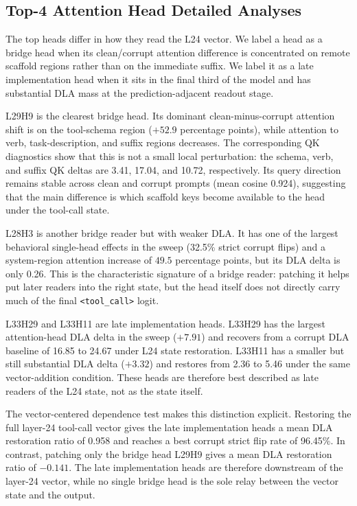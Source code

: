 \subsection{Top-4 Attention Head Detailed Analyses}
The top heads differ in how they read the L24 vector.  We label a head as a
bridge head when its clean/corrupt attention difference is concentrated on
remote scaffold regions rather than on the immediate suffix.  We label it as a
late implementation head when it sits in the final third of the model and has
substantial DLA mass at the prediction-adjacent readout stage.

L29H9 is the clearest bridge head.  Its dominant clean-minus-corrupt attention
shift is on the tool-schema region ($+52.9$ percentage points),
while attention to verb, task-description, and suffix regions decreases.  The corresponding
QK diagnostics show that this is not a small local perturbation: the schema,
verb, and suffix QK deltas are 3.41, 17.04, and 10.72, respectively.  Its
query direction remains stable across clean and corrupt prompts
(mean cosine 0.924), suggesting that the main difference is which scaffold
keys become available to the head under the tool-call state.

L28H3 is another bridge reader but with weaker DLA.  It has one of the largest
behavioral single-head effects in the sweep (32.5\% strict corrupt flips) and
a system-region attention increase of $49.5$ percentage points, but its DLA
delta is only 0.26.  This is the characteristic signature of a bridge reader:
patching it helps put later readers into the right state, but the head itself
does not directly carry much of the final \texttt{<tool\_call>} logit.

L33H29 and L33H11 are late implementation heads.  L33H29 has the largest
attention-head DLA delta in the sweep ($+7.91$) and recovers from a corrupt
DLA baseline of 16.85 to 24.67 under L24 state restoration.  L33H11 has a
smaller but still substantial DLA delta ($+3.32$) and restores from 2.36 to
5.46 under the same vector-addition condition.  These heads are therefore best
described as late readers of the L24 state, not as the state itself.

The vector-centered dependence test makes this distinction explicit. Restoring
the full layer-24 tool-call vector gives the late implementation heads a mean
DLA restoration ratio of 0.958 and reaches a best corrupt strict flip rate of
96.45\%. In contrast, patching only the bridge head L29H9 gives a mean DLA
restoration ratio of $-0.141$. The late implementation heads are therefore
downstream of the layer-24 vector, while no single bridge head is the sole
relay between the vector state and the output.

